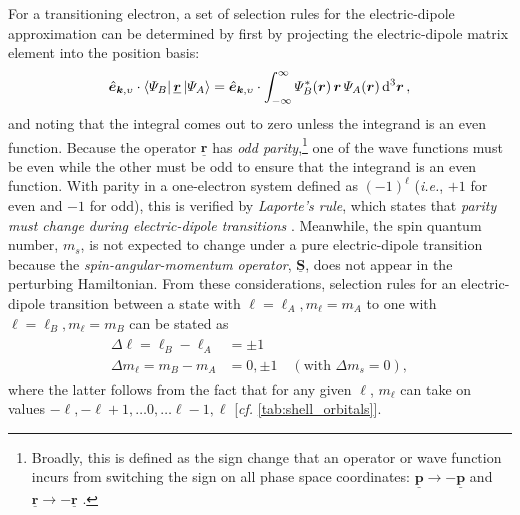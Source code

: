 For a transitioning electron, a set of selection rules for the electric-dipole approximation can be determined by first by projecting the electric-dipole matrix element into the position basis:
\begin{equation}
 \hat{\mathbold{e}}_{\mathbold{k},\upsilon} \cdot \bra{\Psi_B} \underline{\mathbold{r}} \ket{\Psi_A} = \hat{\mathbold{e}}_{\mathbold{k},\upsilon} \cdot \int_{-\infty}^{\infty} \Psi_B^* (\mathbold{r}) \, \mathbold{r} \, \Psi_A (\mathbold{r}) \dd[3]{\mathbold{r}} ,
 \end{equation}
and noting that the integral comes out to zero unless the integrand is an even function. 
Because the operator $\underline{\mathbold{r}}$ has \emph{odd parity},\footnote{Broadly, this is defined as the sign change that an operator or wave function incurs from switching the sign on all phase space coordinates: $\underline{\mathbold{p}} \to -\underline{\mathbold{p}}$ and $\underline{\mathbold{r}} \to -\underline{\mathbold{r}}$ \cite{Rybicki86}.} one of the wave functions must be even while the other must be odd to ensure that the integrand is an even function. 
With parity in a one-electron system defined as $(-1)^{\ell}$ (\emph{i.e.}, $+1$ for even and $-1$ for odd), this is verified by \emph{Laporte's rule}, which states that \emph{parity must change during electric-dipole transitions} \cite{Rybicki86,Bethe57}. 
Meanwhile, the spin quantum number, $m_s$, is not expected to change under a pure electric-dipole transition because the \emph{spin-angular-momentum operator}, $\underline{\mathbold{S}}$, does not appear in the perturbing Hamiltonian.
From these considerations, selection rules for an electric-dipole transition between a state with $\ell = \ell_A, m_{\ell} = m_A$ to one with $\ell = \ell_B, m_{\ell} = m_B$ can be stated as 
\begin{align}
 \begin{split}\label{eq:hydrogen_E1_selection_rules}
 \Delta \ell = \ell_B - \ell_A &= \pm 1 \\
 \Delta m_{\ell} = m_B - m_A &= 0, \pm 1 \quad (\text{with } \Delta m_s =0),
  \end{split}
 \end{align}
where the latter follows from the fact that for any given $\ell$, $m_{\ell}$ can take on values $-\ell, -\ell + 1, \dotsc 0, \dotsc \ell -1, \ell$ [\emph{cf.\@} \cref{tab:shell_orbitals}]. 

